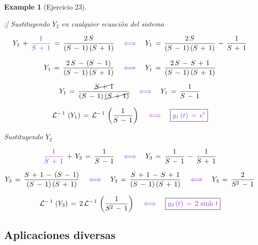 \documentclass[a4paper,11pt,openany]{book}
\newtheorem{exmp}{Example}[section]
\newcommand*{\itembolasazules}[1]{%
\footnotesize\protect\tikz[baseline=-3pt]%
\protect\node[scale=.7, circle, shade, ball
color=green]{\color{white}\Large\bf#1};}
\begin{document}
\begin{exmp}[Ejercicio 23]
\begin{enumerate}[label=\itembolasazules{\arabic*}]
Sustituyendo $Y_{2}$ en cualquier ecuación del sistema
 
$$Y_{1}\,+\,\textcolor{blue-violet}{\dfrac{1}{S\,+\,1} }\,=\,\dfrac{2\,S}{(S\,-\,1)\,(S\,+\,1) } \quad \textcolor{blue-violet}{\iff} \quad Y_{1}\,=\,\dfrac{2\,S}{(S\,-\,1)\,(S\,+\,1) }\,-\,\dfrac{1}{S\,+\,1}$$
 
$$Y_{1}\,=\,\dfrac{2\,S\,-\,(S\,-\,1)}{(S\,-\,1)\,(S\,+\,1) } \quad \textcolor{blue-violet}{\iff} \quad Y_{1}\,=\,\dfrac{2\,S\,-\,S\,+\,1}{(S\,-\,1)\,(S\,+\,1) }$$
 
$$Y_{1}\,=\,\dfrac{\cancel{S\,+\,1}}{(S\,-\,1)\,\cancel{(S\,+\,1)} } \quad \textcolor{blue-violet}{\iff} \quad Y_{1}\,=\,\dfrac{1}{S\,-\,1}$$
 
$$\mathcal{L}^{-\,1}\,\left(Y_{1} \right)\,=\,\mathcal{L}^{-\,1}\,\left(\dfrac{1}{S\,-\,1} \right) \quad \textcolor{blue-violet}{\iff} \quad \boxed{\textcolor{blue-violet}{y_{1}\,(t)\,=\,e^{t} } }$$
 
Sustituyendo $Y_{2}$
 
$$\textcolor{blue-violet}{\dfrac{1}{S\,+\,1}}\,+\,Y_{3}\,=\,\dfrac{1}{S\,-\,1} \quad \textcolor{blue-violet}{\iff} \quad Y_{3}\,=\,\dfrac{1}{S\,-\,1}\,-\,\dfrac{1}{S\,+\,1}$$
 
$$Y_{3}\,=\,\dfrac{S\,+\,1\,-\,(S\,-\,1)}{(S\,-\,1)\,(S\,+\,1) } \quad \textcolor{blue-violet}{\iff} \quad Y_{3}\,=\,\dfrac{S\,+\,1\,-\,S\,+\,1}{(S\,-\,1)\,(S\,+\,1) } \quad \textcolor{blue-violet}{\iff} \quad Y_{3}\,=\,\dfrac{2}{S^{2}\,-\,1}$$
 
$$\mathcal{L}^{-\,1}\,\left(Y_{3} \right)\,=\,2\,\mathcal{L}^{-\,1}\,\left(\dfrac{1}{S^{2}\,-\,1} \right) \quad \textcolor{blue-violet}{\iff} \quad \boxed{\textcolor{blue-violet}{y_{3}\,(t)\,=\,2\,\sinh\,t } }$$
 
\end{enumerate}

\end{exmp}
 
 
\textcolor{darkcerulean}{\chapter{Aplicaciones diversas}}
 
\end{document}
